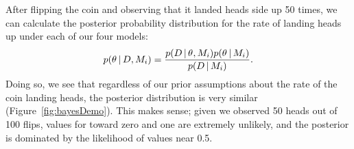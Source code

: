 \begin{linenomath}
After flipping the coin and observing that it landed heads side up 50 times, we
can calculate the posterior probability distribution for the rate of landing
heads up under each of our four models:
\begin{equation}
    p(\probheads \given \flipdata, \coinmodel[i]) = \frac{
        p(\flipdata \given \probheads, \coinmodel[i]) p(\probheads \given \coinmodel[i])
    }{
        p(\flipdata \given \coinmodel[i])
    }.
    \label{eq:coinBayesRule}
\end{equation}
Doing so, we see that regardless of our prior assumptions about the rate of the
coin landing heads, the posterior distribution is very similar
(Figure~\ref{fig:bayesDemo}).
This makes sense; given we observed 50 heads out of 100 flips, values for
\probheads toward zero and one are extremely unlikely, and the posterior is
dominated by the likelihood of values near 0.5.
\end{linenomath}

